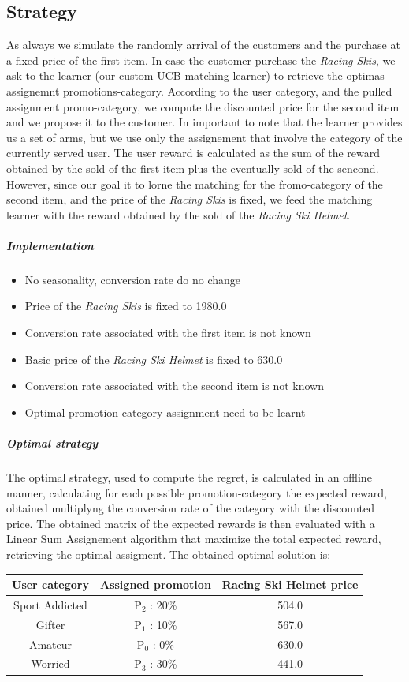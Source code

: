 \subsection*{Strategy}

As always we simulate the randomly arrival of the customers and the purchase at a fixed price of the first item. In case the customer purchase the \textit{Racing Skis}, we ask to the learner (our custom UCB matching learner) to retrieve the optimas assignemnt promotions-category. According to the user category, and the pulled assignment promo-category, we compute the discounted price for the second item and we propose it to the customer. In important to note that the learner provides us a set of arms, but we use only the assignement that involve the category of the currently served user. The user reward is calculated as the sum of the reward obtained by the sold of the first item plus the eventually sold of the sencond. However, since our goal it to lorne the matching for the fromo-category of the second item, and the price of the \textit{Racing Skis} is fixed, we feed the matching learner with the reward obtained by the sold of the \textit{Racing Ski Helmet}. 

\subparagraph{Implementation} 
\begin{itemize}
	\item No seasonality, conversion rate do no change
	\item Price of the \textit{Racing Skis} is fixed to 1980.0
	\item Conversion rate associated with the first item is not known
	\item Basic price of the \textit{Racing Ski Helmet} is fixed to 630.0
	\item Conversion rate associated with the second item is not known
	\item Optimal promotion-category assignment need to be learnt
\end{itemize}

\subparagraph{Optimal strategy}The optimal strategy, used to compute the regret, is calculated in an offline manner, calculating for each possible promotion-category the expected reward, obtained multiplyng the conversion rate of the category with the discounted price. The obtained matrix of the expected rewards is then evaluated with a Linear Sum Assignement algorithm that maximize the total expected reward, retrieving the optimal assigment. The obtained optimal solution is:\\
\begin{center}
	\begin{tabular}{ |c|c|c|} 
	\hline
	User category & Assigned promotion & Racing Ski Helmet price \\
	\hline
	Sport Addicted & P$_2$ : 20\% & 504.0 \\
	\hline
	Gifter & P$_1$ : 10\% & 567.0 \\
	\hline
	Amateur & P$_0$ : 0\% & 630.0 \\
	\hline
	Worried & P$_3$ : 30\% & 441.0 \\
	\hline
	\end{tabular}
\end{center}

